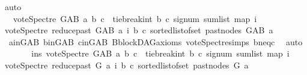 \begin{isabellebody}
\ auto\isanewline
\ \ \ \ \isamarkupfalse%
\ \isamarkupfalse%
\ \ {\isachardoublequoteopen}\ vote{\isacharunderscore}{\kern0pt}Spectre\ G{\isacharunderscore}{\kern0pt}AB\ a\ b\ c\ {\isacharequal}{\kern0pt}\ {\isacharparenleft}{\kern0pt}tie{\isacharunderscore}{\kern0pt}break{\isacharunderscore}{\kern0pt}int\ b\ c\ {\isacharparenleft}{\kern0pt}signum\ {\isacharparenleft}{\kern0pt}sum{\isacharunderscore}{\kern0pt}list\ {\isacharparenleft}{\kern0pt}map\ {\isacharparenleft}{\kern0pt}{\isasymlambda}i{\isachardot}{\kern0pt}\isanewline
\ {\isacharparenleft}{\kern0pt}vote{\isacharunderscore}{\kern0pt}Spectre\ {\isacharparenleft}{\kern0pt}reduce{\isacharunderscore}{\kern0pt}past\ G{\isacharunderscore}{\kern0pt}AB\ a{\isacharparenright}{\kern0pt}\ i\ b\ c{\isacharparenright}{\kern0pt}{\isacharparenright}{\kern0pt}\ {\isacharparenleft}{\kern0pt}sorted{\isacharunderscore}{\kern0pt}list{\isacharunderscore}{\kern0pt}of{\isacharunderscore}{\kern0pt}set\ {\isacharparenleft}{\kern0pt}past{\isacharunderscore}{\kern0pt}nodes\ G{\isacharunderscore}{\kern0pt}AB\ a{\isacharparenright}{\kern0pt}{\isacharparenright}{\kern0pt}{\isacharparenright}{\kern0pt}{\isacharparenright}{\kern0pt}{\isacharparenright}{\kern0pt}{\isacharparenright}{\kern0pt}{\isachardoublequoteclose}\isanewline
\ \ \ \ \ \ \isamarkupfalse%
\ \ a{\isacharunderscore}{\kern0pt}in{\isacharunderscore}{\kern0pt}G{\isacharunderscore}{\kern0pt}AB\ b{\isacharunderscore}{\kern0pt}in{\isacharunderscore}{\kern0pt}G{\isacharunderscore}{\kern0pt}AB\ c{\isacharunderscore}{\kern0pt}in{\isacharunderscore}{\kern0pt}G{\isacharunderscore}{\kern0pt}AB\ B{}{\isachardot}{\kern0pt}blockDAG{\isacharunderscore}{\kern0pt}axioms\ vote{\isacharunderscore}{\kern0pt}Spectre{\isachardot}{\kern0pt}simps\ bneqc\ \isamarkupfalse%
\ auto\isanewline
\ \ \ \ \isamarkupfalse%
\ \isamarkupfalse%
\ ins{\isacharunderscore}{\kern0pt}{}{\isacharcolon}{\kern0pt}\ {\isachardoublequoteopen}vote{\isacharunderscore}{\kern0pt}Spectre\ G{\isacharunderscore}{\kern0pt}AB\ a\ b\ c\ {\isacharequal}{\kern0pt}\ {\isacharparenleft}{\kern0pt}tie{\isacharunderscore}{\kern0pt}break{\isacharunderscore}{\kern0pt}int\ b\ c\ {\isacharparenleft}{\kern0pt}signum\ {\isacharparenleft}{\kern0pt}sum{\isacharunderscore}{\kern0pt}list\ {\isacharparenleft}{\kern0pt}map\ {\isacharparenleft}{\kern0pt}{\isasymlambda}i{\isachardot}{\kern0pt}\isanewline
\ {\isacharparenleft}{\kern0pt}vote{\isacharunderscore}{\kern0pt}Spectre\ {\isacharparenleft}{\kern0pt}reduce{\isacharunderscore}{\kern0pt}past\ G\ a{\isacharparenright}{\kern0pt}\ i\ b\ c{\isacharparenright}{\kern0pt}{\isacharparenright}{\kern0pt}\ {\isacharparenleft}{\kern0pt}sorted{\isacharunderscore}{\kern0pt}list{\isacharunderscore}{\kern0pt}of{\isacharunderscore}{\kern0pt}set\ {\isacharparenleft}{\kern0pt}past{\isacharunderscore}{\kern0pt}nodes\ G\ a{\isacharparenright}{\kern0pt}{\isacharparenright}{\kern0pt}{\isacharparenright}{\kern0pt}{\isacharparenright}{\kern0pt}{\isacharparenright}{\kern0pt}{\isacharparenright}{\kern0pt}{\isachardoublequoteclose}\isanewline

\end{isabellebody}
